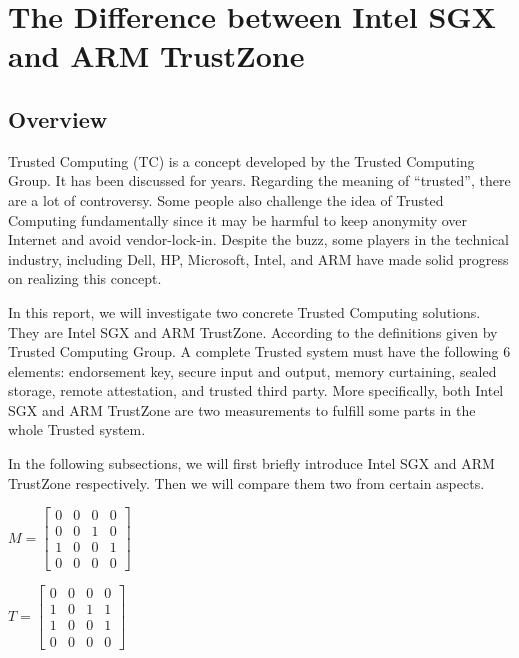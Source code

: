 \section{The Difference between Intel SGX and ARM TrustZone}\label{sec:difference}







\subsection{Overview}
Trusted Computing (TC) is a concept developed by the Trusted Computing Group.
It has been discussed for years. Regarding the meaning of ``trusted'', there
are a lot of controversy. Some people also challenge the idea of Trusted
Computing fundamentally since it may be harmful to keep anonymity over 
Internet and avoid vendor-lock-in. Despite the buzz, some players in 
the technical industry, including Dell, HP, Microsoft, Intel, and ARM 
have made solid progress on realizing this concept.

In this report, we will investigate two concrete Trusted Computing solutions.
They are Intel SGX and ARM TrustZone. 
According to the definitions given by Trusted Computing Group. A complete 
Trusted system must have the following 6 elements: endorsement key, 
secure input and output, memory curtaining, sealed storage, remote 
attestation, and trusted third party. More specifically, both Intel
SGX and ARM TrustZone are two measurements to fulfill some parts
in the whole Trusted system.  
 
In the following subsections, we will first briefly introduce 
Intel SGX and ARM TrustZone respectively. Then we will compare 
them two from certain aspects.

$M=\left [ \begin{array}{lcrr}
	0 & 0 & 0 & 0 \\ 
	0 & 0 & 1 & 0\\
	1 & 0 & 0 & 1\\
	0 & 0 & 0 & 0
\end{array}  \right ]$







$T=\left [ \begin{array}{lcrr}
0 & 0 & 0 & 0 \\ 
1 & 0 & 1 & 1\\
1 & 0 & 0 & 1\\
0 & 0 & 0 & 0
\end{array}  \right ]$




